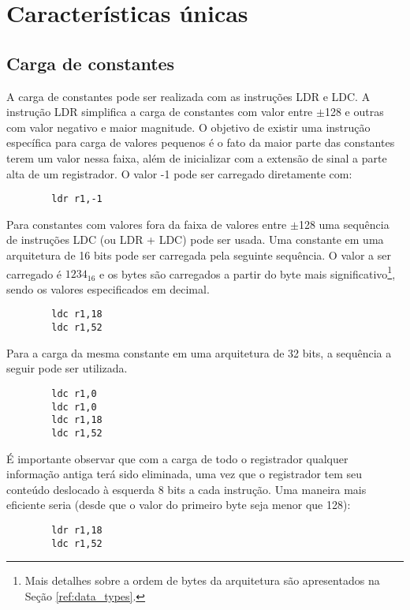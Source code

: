 \documentclass{extreport}
\begin{document}
\section{Características únicas}
\subsection{Carga de constantes}
\label{ref:constants}
A carga de constantes pode ser realizada com as instruções LDR e LDC. A instrução LDR simplifica a carga de constantes com valor entre $\pm$128 e outras com valor negativo e maior magnitude. O objetivo de existir uma instrução específica para carga de valores pequenos é o fato da maior parte das constantes terem um valor nessa faixa, além de inicializar com a extensão de sinal a parte alta de um registrador. O valor -1 pode ser carregado diretamente com:

\begin{verbatim}
        ldr r1,-1
\end{verbatim}

Para constantes com valores fora da faixa de valores entre $\pm$128 uma sequência de instruções LDC (ou LDR + LDC) pode ser usada. Uma constante em uma arquitetura de 16 bits pode ser carregada pela seguinte sequência. O valor a ser carregado é $1234_{16}$ e os bytes são carregados a partir do byte mais significativo\footnote{Mais detalhes sobre a ordem de bytes da arquitetura são apresentados na Seção \ref{ref:data_types}.}, sendo os valores especificados em decimal.

\begin{verbatim}
        ldc r1,18
        ldc r1,52
\end{verbatim}

Para a carga da mesma constante em uma arquitetura de 32 bits, a sequência a seguir pode ser utilizada.

\begin{verbatim}
        ldc r1,0
        ldc r1,0
        ldc r1,18
        ldc r1,52
\end{verbatim}

É importante observar que com a carga de todo o registrador qualquer informação antiga terá sido eliminada, uma vez que o registrador tem seu conteúdo deslocado à esquerda 8 bits a cada instrução. Uma maneira mais eficiente seria (desde que o valor do primeiro byte seja menor que 128):

\begin{verbatim}
        ldr r1,18
        ldc r1,52
\end{verbatim}
\end{document}

